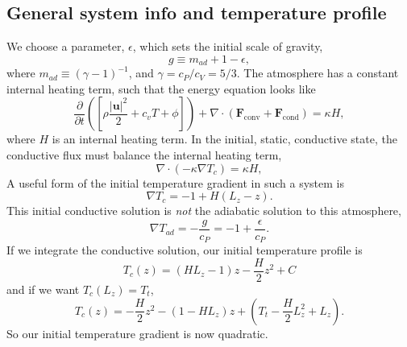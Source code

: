 \documentclass[aps, pre, onecolumn, nofootinbib, notitlepage, groupedaddress, amsfonts, amssymb, amsmath, longbibliography]{revtex4-1}
\newcommand{\grad}{\ensuremath{\nabla}}
\begin{document}
\subsection{General system info and temperature profile}
We choose a parameter, $\epsilon$, which sets the initial scale of gravity,
\begin{equation}
g \equiv m_{ad} + 1 - \epsilon,
\end{equation}
where $m_{ad} \equiv (\gamma - 1)^{-1}$, and $\gamma = c_P / c_V = 5/3$.  The atmosphere
has a constant internal heating term, such that the energy equation looks like
\begin{equation}
\frac{\partial}{\partial t}\left(\left[\rho\frac{|\bm{u}|^2}{2} + c_v T + \phi\right]\right)
+ \grad\cdot\left(\bm{F}_{\text{conv}} + \bm{F}_{\text{cond}}\right) = \kappa H,
\end{equation}
where $H$ is an internal heating term.  In the initial, static, conductive state, the
conductive flux must balance the internal heating term,
\begin{equation}
\grad\cdot\left(-\kappa\grad T_{c}\right) = \kappa H,
\end{equation}
A useful form of the initial temperature gradient in such a system is
\begin{equation}
\boxed{
\grad T_{c} = - 1 + H (L_z - z)} .
\end{equation}
This initial conductive solution is \emph{not} the adiabatic solution to this atmosphere,
\begin{equation}
\grad T_{ad} = -\frac{g}{c_P} = -1 + \frac{\epsilon}{c_P}.
\end{equation}
If we integrate the conductive solution, our initial temperature profile is
$$
T_c(z) = (H L_z - 1) z - \frac{H}{2}z^2 + C
$$
and if we want $T_c(L_z) = T_t$,
\begin{equation}
\boxed{
T_c(z) = -\frac{H}{2}z^2 - (1 - H L_z) z + \left(T_t - \frac{H}{2}L_z^2 + L_z\right)}.
\end{equation}
So our initial temperature gradient is now quadratic.
\end{document}
